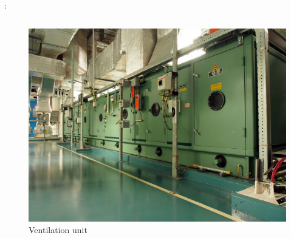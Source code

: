 \documentclass[aspectratio=169]{beamer}
\begin{document}
\begin{frame}{\insertsectionhead: \insertsubsectionhead}
\begin{columns}
        \begin{column}{0.5\paperwidth}
            \begin{figure}
                \includegraphics[width = 0.8\columnwidth, keepaspectratio]{hvac}
                \caption{Ventilation unit \cite{hvac}}
            \end{figure}
        \end{column}
    \end{columns}
\end{frame}

\end{document}
